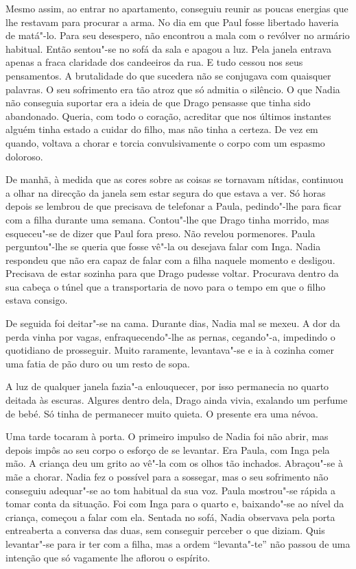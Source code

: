 Mesmo assim, ao entrar no apartamento, conseguiu
reunir as poucas energias que lhe restavam para procurar a arma. No dia
em que Paul fosse libertado haveria de matá"-lo. Para seu desespero, não
encontrou a mala com o
revólver no armário habitual. Então sentou"-se no sofá da sala e apagou a
luz. Pela janela entrava apenas a fraca claridade dos candeeiros da rua.
E tudo cessou nos seus pensamentos. A brutalidade do que sucedera não se
conjugava com quaisquer palavras. O seu sofrimento era tão atroz que
só admitia o silêncio. O que Nadia não conseguia suportar era a ideia
de que Drago pensasse que tinha sido abandonado. Queria, com todo o
coração, acreditar que nos últimos instantes alguém tinha estado a
cuidar do filho, mas não tinha a certeza. De vez em quando, voltava a
chorar e torcia convulsivamente o corpo com um espasmo doloroso.

De manhã, à medida que as cores sobre as coisas se tornavam nítidas,
continuou a olhar na direcção da janela sem estar segura do que estava a
ver. Só horas depois se lembrou de que precisava de telefonar a Paula,
pedindo"-lhe para ficar com a filha durante uma semana. Contou"-lhe que
Drago tinha morrido, mas esqueceu"-se de dizer que Paul fora preso. Não
revelou pormenores. Paula perguntou"-lhe se queria que fosse vê"-la ou desejava falar com Inga. Nadia
respondeu que não era capaz de falar com a filha naquele momento e
desligou. Precisava de estar sozinha para que Drago pudesse voltar.
Procurava dentro da sua cabeça o túnel que a transportaria de novo para
o tempo em que o filho estava consigo.

De seguida foi deitar"-se na cama. Durante dias, Nadia mal se mexeu. A
dor da perda vinha por vagas, enfraquecendo"-lhe as pernas, cegando"-a,
impedindo o quotidiano de prosseguir. Muito raramente, levantava"-se e
ia à cozinha comer uma fatia de pão duro ou um resto de sopa.

A luz de qualquer janela fazia"-a enlouquecer, por isso permanecia no
quarto deitada às escuras. Algures dentro dela, Drago ainda vivia,
exalando um perfume de bebé. Só tinha de permanecer muito quieta. O
presente era uma névoa.

Uma tarde tocaram à porta. O primeiro impulso de Nadia foi não abrir,
mas depois impôs ao seu corpo o esforço de se levantar. Era Paula, com
Inga pela mão. A criança deu um grito ao vê"-la com os olhos tão
inchados. Abraçou"-se à mãe a chorar. Nadia fez o possível para a
sossegar, mas o seu sofrimento não conseguiu adequar"-se ao tom habitual
da sua voz. Paula mostrou"-se rápida a tomar conta da situação. Foi com
Inga para o quarto e, baixando"-se ao nível da criança, começou a falar com ela. Sentada no sofá, Nadia
observava pela porta entreaberta a conversa das duas, sem conseguir
perceber o que diziam. Quis levantar"-se para ir ter com a filha, mas a
ordem ``levanta"-te'' não passou de uma intenção que só vagamente lhe
aflorou o espírito.

